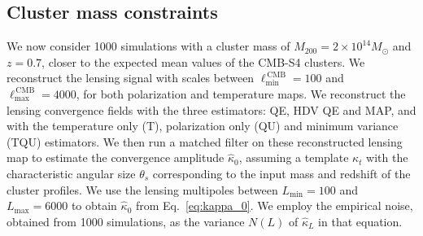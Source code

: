 \documentclass[prd, superscriptaddress, tightenlines, longbibliography, nofootinbib, eqsecnum, amsfonts, amsmath, floatfix, twocolumn, notitlepage]{revtex4-2}
\begin{document}
\subsection{Cluster mass constraints}


We now consider 1000 simulations with a cluster mass of $M_{200} = 2 \times 10^{14} M_{\odot}$ and $z=0.7$, closer to the expected mean values of the CMB-S4 clusters. We reconstruct the lensing signal with scales between  $\ell_{\text{min}}^{\, \text{CMB}}=100$ and $\ell_{\text{max}}^{\, \text{CMB}} = 4000$, for both polarization and temperature maps.
We reconstruct the lensing convergence fields with the three estimators: QE, HDV QE and MAP, and with the temperature only (T), polarization only (QU) and minimum variance (TQU) estimators. We then run a matched filter on these reconstructed lensing map to estimate the convergence amplitude $\hat \kappa_0$, assuming a template $\kappa_t$ with the characteristic angular size $\theta_s$ corresponding to the input mass and redshift of the cluster profiles.
We use the lensing multipoles between $L_{\text{min}}=100$ and $L_{\text{max}}=6000$ to obtain $\hat \kappa_0$ from Eq.~\ref{eq:kappa_0}. We employ the empirical noise, obtained from 1000 simulations, as the variance $N(L)$ of $\hat \kappa_{L}$ in that equation.
\end{document}
